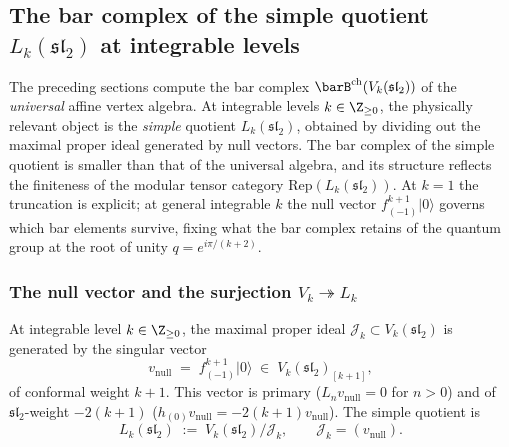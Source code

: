 %
%

\subsection{The bar complex of the simple quotient
 \texorpdfstring{$L_k(\mathfrak{sl}_2)$}{L\_k(sl\_2)}
 at integrable levels}
\label{subsec:bar-complex-integrable}

The preceding sections compute the bar complex
$\barB^{\mathrm{ch}}(V_k(\mathfrak{sl}_2))$ of the
\emph{universal} affine vertex algebra. At integrable levels
$k \in \Z_{\ge 0}$, the physically relevant object is the
\emph{simple} quotient $L_k(\mathfrak{sl}_2)$, obtained by
dividing out the maximal proper ideal generated by null
vectors. The bar complex of the simple quotient is smaller
than that of the universal algebra, and its structure reflects
the finiteness of the modular tensor category
$\mathrm{Rep}(L_k(\mathfrak{sl}_2))$. At $k = 1$ the truncation
is explicit; at general integrable $k$ the null vector
$f_{(-1)}^{k+1}|0\rangle$ governs which bar elements survive,
fixing what the bar complex retains of the quantum group at the
root of unity $q = e^{i\pi/(k+2)}$.


\subsubsection{The null vector and the surjection
 \texorpdfstring{$V_k \twoheadrightarrow L_k$}{V\_k -> L\_k}}
\label{subsubsec:null-vector-surjection}

At integrable level $k \in \Z_{\ge 0}$, the maximal proper
ideal $\mathcal{J}_k \subset V_k(\mathfrak{sl}_2)$ is
generated by the singular vector
\begin{equation}\label{eq:null-vector-sl2}
 v_{\mathrm{null}}
 \;=\;
 f_{(-1)}^{k+1} |0\rangle
 \;\in\;
 V_k(\mathfrak{sl}_2)_{[k+1]},
\end{equation}
of conformal weight $k + 1$. This vector is primary
($L_n v_{\mathrm{null}} = 0$ for $n > 0$) and of
$\mathfrak{sl}_2$-weight $-2(k+1)$
($h_{(0)} v_{\mathrm{null}} = -2(k+1) v_{\mathrm{null}}$).
The simple quotient is
\begin{equation}\label{eq:simple-quotient-sl2}
 L_k(\mathfrak{sl}_2)
 \;:=\;
 V_k(\mathfrak{sl}_2) / \mathcal{J}_k,
 \qquad
 \mathcal{J}_k = (v_{\mathrm{null}}).
\end{equation}

